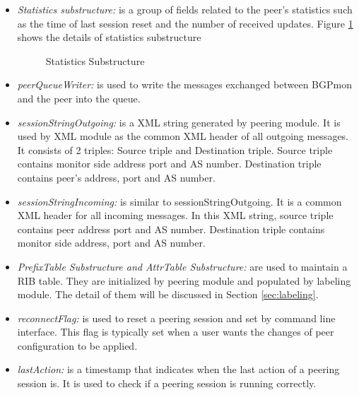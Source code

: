 \begin{itemize}
\item{\emph{Statistics substructure:} is a group of fields related to the peer's statistics such as the time of last session reset and the number of received updates. Figure \ref{fig:StatSub} shows the details of statistics substructure}
\begin{figure}
\centering
{}
\caption{Statistics Substructure}
\label{fig:StatSub}
\end{figure}

\item{\emph{peerQueueWriter:} is used to write the messages exchanged between BGPmon and the peer into the queue. }

\item{\emph{sessionStringOutgoing:} is a XML string generated by peering module. It is used by XML module as the common XML header of all outgoing messages. It consists of 2 triples: Source triple and Destination triple.
Source triple contains monitor side address port and AS number.  Destination triple contains peer's address, port and AS number.   }

\item{\emph{sessionStringIncoming:} is similar to sessionStringOutgoing. It is a common XML header for all incoming messages. In this XML string, source triple contains peer address port and AS number.  Destination triple contains monitor side address, port and AS number. }

\item{\emph{PrefixTable Substructure and AttrTable Substructure:} are used to maintain a RIB table. They are initialized by peering module and populated by labeling module. The detail of them will be discussed in Section \ref{sec:labeling}. }

\item{\emph{reconnectFlag:} is used to reset a peering session and set by command line interface. This flag is typically set when a user wants the changes of peer configuration to be applied. }

\item{\emph{lastAction:} is a timestamp that indicates when the last action of a peering session is. It is used to check if a peering session is running correctly. }

\end{itemize}

